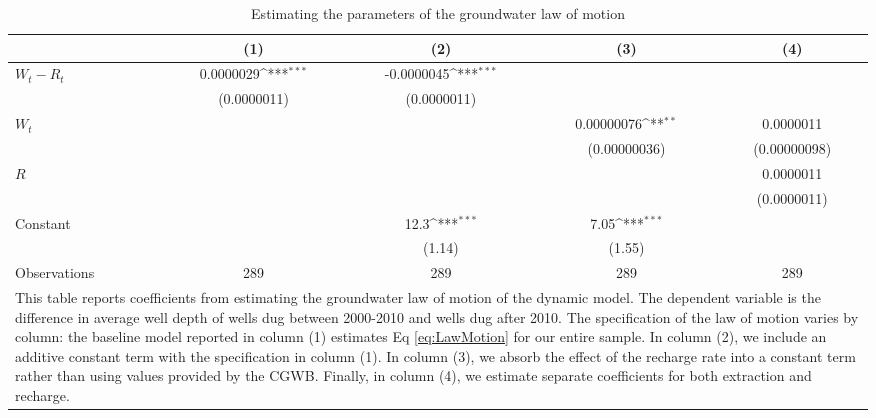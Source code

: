 \begin{table}[htbp]\centering
\def\sym#1{\ifmmode^{#1}\else\(^{#1}\)\fi}
\caption{Estimating the parameters of the groundwater law of motion}
\begin{tabular}{l*{4}{c}}
\toprule
                    &\multicolumn{1}{c}{(1)}         &\multicolumn{1}{c}{(2)}         &\multicolumn{1}{c}{(3)}         &\multicolumn{1}{c}{(4)}         \\
\midrule
$ W_t - R_t $       &   0.0000029\sym{***}&  -0.0000045\sym{***}&                     &                     \\
                    & (0.0000011)         & (0.0000011)         &                     &                     \\
$ W_t $             &                     &                     &  0.00000076\sym{**} &   0.0000011         \\
                    &                     &                     &(0.00000036)         &(0.00000098)         \\
$ R $               &                     &                     &                     &   0.0000011         \\
                    &                     &                     &                     & (0.0000011)         \\
Constant            &                     &        12.3\sym{***}&        7.05\sym{***}&                     \\
                    &                     &      (1.14)         &      (1.55)         &                     \\
\midrule
Observations        &         289         &         289         &         289         &         289         \\
\bottomrule
\multicolumn{5}{p{0.7\hsize}}{\footnotesize This table reports coefficients from estimating the groundwater law of motion of the dynamic model. The dependent variable is the difference in average well depth of wells dug between 2000-2010 and wells dug after 2010. The specification of the law of motion varies by column: the baseline model reported in column (1) estimates Eq \eqref{eq:LawMotion} for our entire sample. In column (2), we include an additive constant term with the specification in column (1). In column (3), we absorb the effect of the recharge rate into a constant term rather than using values provided by the CGWB. Finally, in column (4), we estimate separate coefficients for both extraction and recharge.
}
\end{tabular}
\end{table}
